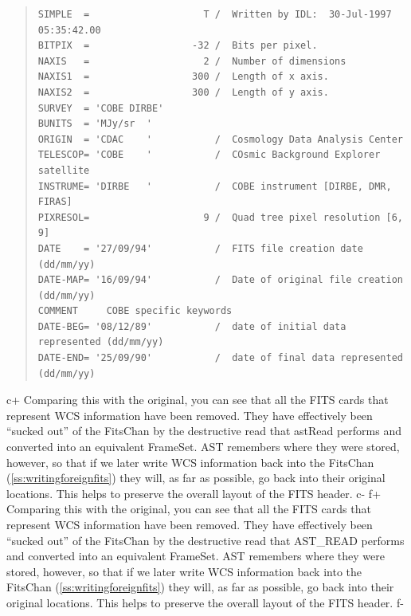 \documentclass[twoside,11pt]{article}
\newcommand{\secref}[1]{\S\ref{#1}}
\renewcommand{\secref}[1]{\ref{#1}}
\begin{document}
\begin{quote}
\small
\begin{verbatim}
SIMPLE  =                    T /  Written by IDL:  30-Jul-1997 05:35:42.00      
BITPIX  =                  -32 /  Bits per pixel.                               
NAXIS   =                    2 /  Number of dimensions                          
NAXIS1  =                  300 /  Length of x axis.                             
NAXIS2  =                  300 /  Length of y axis.                             
SURVEY  = 'COBE DIRBE'                                                          
BUNITS  = 'MJy/sr  '                                                            
ORIGIN  = 'CDAC    '           /  Cosmology Data Analysis Center                
TELESCOP= 'COBE    '           /  COsmic Background Explorer satellite          
INSTRUME= 'DIRBE   '           /  COBE instrument [DIRBE, DMR, FIRAS]           
PIXRESOL=                    9 /  Quad tree pixel resolution [6, 9]             
DATE    = '27/09/94'           /  FITS file creation date (dd/mm/yy)            
DATE-MAP= '16/09/94'           /  Date of original file creation (dd/mm/yy)     
COMMENT     COBE specific keywords                                              
DATE-BEG= '08/12/89'           /  date of initial data represented (dd/mm/yy)   
DATE-END= '25/09/90'           /  date of final data represented   (dd/mm/yy)   
\end{verbatim}
\normalsize
\end{quote}

c+
Comparing this with the original, you can see that all the FITS cards
that represent WCS information have been removed. They have
effectively been ``sucked out'' of the FitsChan by the destructive
read that astRead performs and converted into an equivalent
FrameSet. AST remembers where they were stored, however, so that if we
later write WCS information back into the FitsChan
(\secref{ss:writingforeignfits}) they will, as far as possible, go
back into their original locations. This helps to preserve the overall
layout of the FITS header.
c-
f+
Comparing this with the original, you can see that all the FITS cards
that represent WCS information have been removed. They have
effectively been ``sucked out'' of the FitsChan by the destructive
read that AST\_READ performs and converted into an equivalent
FrameSet. AST remembers where they were stored, however, so that if we
later write WCS information back into the FitsChan
(\secref{ss:writingforeignfits}) they will, as far as possible, go
back into their original locations.  This helps to preserve the
overall layout of the FITS header.
f-
\end{document}
